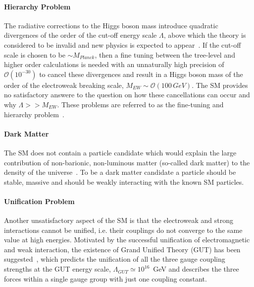 \paragraph{Hierarchy Problem} The radiative corrections to the Higgs boson mass introduce quadratic divergences of the order  
	of the cut-off energy scale $\Lambda$, above which the theory is considered to be invalid and new physics 
	is expected to appear~\cite{Lambda}. If the cut-off scale is chosen to be $\sim M_{Planck}$, then a fine tuning 
	between the tree-level and higher order calculations is needed with an unnaturally high precision of $\mathcal{O}(10^{-30})$
	to cancel these divergences  and result in a  Higgs boson mass of the order of the electroweak breaking scale, $M_{EW}\sim\mathcal{O}(100\,GeV)$.
	The SM provides no satisfactory answere to the question on  how these cancellations can occur and why $\Lambda >> M_{EW}$. These problems are
	referred to as the fine-tuning and hierarchy problem~\cite{Hierarchy1,Hierarchy2,Hierarchy3}.

\paragraph{Dark Matter}   The SM does not contain a particle candidate which would explain the large contribution 
	of non-barionic, non-luminous matter (so-called dark matter) to the density of the universe~\cite{darkmatter1,darkmatter2,darkmatter3}. 
	To be a dark matter candidate a particle should be stable, massive and should be weakly interacting with the known SM particles. 

\paragraph{Unification Problem}	Another unsatisfactory aspect of the SM is that the electroweak and strong interactions cannot be unified, i.e.
	their couplings do not converge to the same value at high energies. Motivated by the successful unification of electromagnetic and weak
	interaction, the existence of Grand Unified Theory (GUT) has been 
	suggested~\cite{GUT1,GUT2}, which predicts the unification of all the three gauge coupling strengths at the GUT energy scale,
	$\Lambda_{GUT} \simeq 10^{16}$~GeV and describes the three forces within a single gauge group with just one coupling constant.

